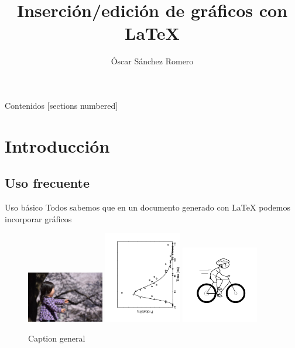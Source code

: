 \documentclass[10pt]{beamer}
\title{Inserción/edición 
de 
gráficos con \LaTeX{}}
\date{}
\author{Óscar Sánchez Romero}
\institute{Dpto. Matemática Aplicada, UGR}
\begin{document}
\maketitle

\begin{frame}{Contenidos}
  [sections numbered]
  \tableofcontents[hideallsubsections]
\end{frame}

\section{Introducción}

\subsection{Uso frecuente}
\begin{frame}[fragile]{Uso básico}
Todos sabemos que en un documento generado con \LaTeX{} podemos incorporar  gráficos  
\begin{figure}[h]
\includegraphics[width=0.3\textwidth]{./graficos/sorpresa.jpg} 
\includegraphics[width=0.3\textwidth]{./graficos/fig_9.pdf}
\includegraphics[width=0.3\textwidth]{./graficos/ciclista.png}
\caption{Caption general}
\label{figGeneral}
\end{figure}
\end{frame}
\end{document}
